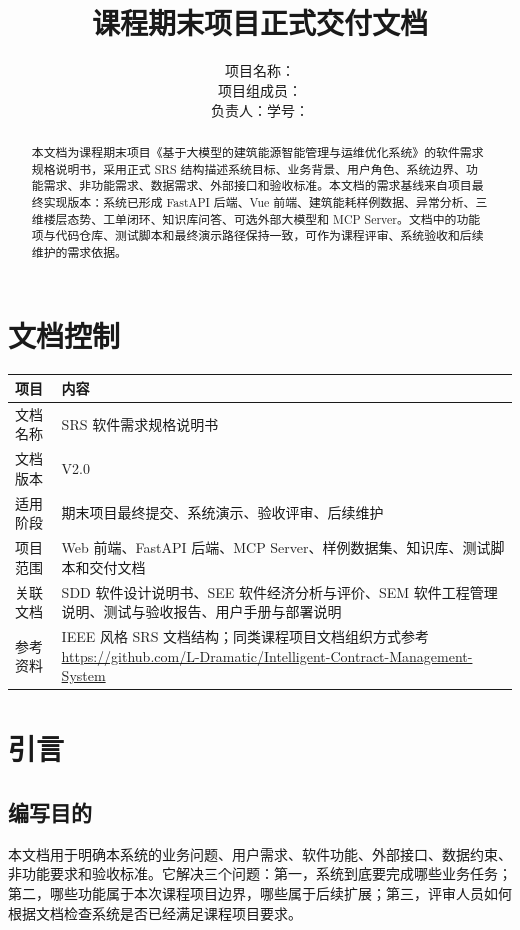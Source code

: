 \documentclass[12pt,a4paper]{ctexart}
\title{
    \vspace{-2em}
    \heiti \zihao{2} \reporttitle \\
    \vspace{1em}
    \zihao{4} 课程期末项目正式交付文档
}
\author{
    \songti \zihao{4}
    项目名称：\projectname \\
    项目组成员：\teamname \\
    负责人：\studentname \quad 学号：\studentid
}
\date{\docdate}
\newcommand{\projectname}{基于大模型的建筑能源智能管理与运维优化系统}
\newcommand{\docversion}{V2.0}
\begin{document}
\maketitle
\thispagestyle{fancy}

\begin{abstract}
本文档为课程期末项目《\projectname》的软件需求规格说明书，采用正式 SRS 结构描述系统目标、业务背景、用户角色、系统边界、功能需求、非功能需求、数据需求、外部接口和验收标准。本文档的需求基线来自项目最终实现版本：系统已形成 FastAPI 后端、Vue 前端、建筑能耗样例数据、异常分析、三维楼层态势、工单闭环、知识库问答、可选外部大模型和 MCP Server。文档中的功能项与代码仓库、测试脚本和最终演示路径保持一致，可作为课程评审、系统验收和后续维护的需求依据。
\end{abstract}

\tableofcontents
\newpage

\section{文档控制}
\begin{longtable}{p{4cm}p{10.5cm}}
\toprule
项目 & 内容 \\
\midrule
文档名称 & SRS 软件需求规格说明书 \\
文档版本 & \docversion \\
适用阶段 & 期末项目最终提交、系统演示、验收评审、后续维护 \\
项目范围 & Web 前端、FastAPI 后端、MCP Server、样例数据集、知识库、测试脚本和交付文档 \\
关联文档 & SDD 软件设计说明书、SEE 软件经济分析与评价、SEM 软件工程管理说明、测试与验收报告、用户手册与部署说明 \\
参考资料 & IEEE 风格 SRS 文档结构；同类课程项目文档组织方式参考 \url{https://github.com/L-Dramatic/Intelligent-Contract-Management-System} \\
\bottomrule
\end{longtable}

\section{引言}
\subsection{编写目的}
本文档用于明确本系统的业务问题、用户需求、软件功能、外部接口、数据约束、非功能要求和验收标准。它解决三个问题：第一，系统到底要完成哪些业务任务；第二，哪些功能属于本次课程项目边界，哪些属于后续扩展；第三，评审人员如何根据文档检查系统是否已经满足课程项目要求。
\end{document}
